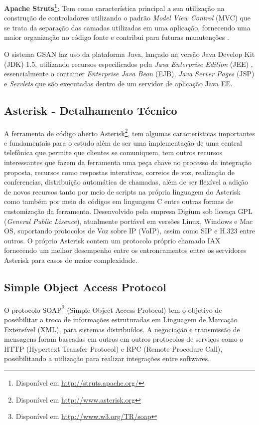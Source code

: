 \textbf{Apache Struts\footnote{Disponível em \url{http://struts.apache.org/}}}: Tem como característica principal a sua utilização na construção de controladores utilizando o padrão \textit{Model View Control} (MVC) que se trata da separação das camadas utilizadas em uma aplicação, fornecendo uma maior organização no código fonte e contribui para futuras manutenções \cite{fowler2003}. 

O sistema GSAN faz uso da plataforma Java, lançado na versão Java Develop Kit (JDK) 1.5, utilizando recursos especificados pela \textit{Java Enterprise Edition} (JEE) \cite{PORTAL:2014}, essencialmente o container \textit{Enterprise Java Bean} (EJB), \textit{Java Server Pages }(JSP) e \textit{Servlets} que são executadas dentro de um servidor de aplicação Java EE.


\subsection{Asterisk - Detalhamento Técnico}
A ferramenta de código aberto Asterisk\footnote{Disponível em \url{http://www.asterisk.org}}, tem algumas características importantes e fundamentais para o estudo além de ser uma implementação de uma central telefônica que permite que clientes se comuniquem, tem outros recursos interessantes que fazem da ferramenta uma peça chave no processo da integração proposta, recursos como respostas interativas, correios de voz, realização de conferencias, distribuição automática de chamadas, além de ser flexível a adição de novos recursos tanto por meio de scripts na própria linguagem do Asterisk como também por meio de códigos em linguagem C entre outras formas de customização da ferramenta. Desenvolvido pela empresa Digium sob licença GPL (\textit{General Public Lisence}), atualmente portável em versões Linux, Windows e Mac OS, suportando protocolos de Voz sobre IP (VoIP), assim como SIP e H.323 entre outros. O próprio Asterisk contem um protocolo próprio chamado IAX fornecendo um melhor desempenho entre os entroncamentos entre os servidores Asterisk para casos de maior complexidade.

\subsection{Simple Object Access Protocol}
O protocolo SOAP\footnote{Disponível em  \url{http://www.w3.org/TR/soap}} (Simple Object Access Protocol) tem o objetivo de possibilitar a troca de informações estruturadas em Linguagem de Marcação Extensível (XML), para sistemas distribuídos. A negociação e transmissão de mensagens foram baseadas em outros em outros protocolos de serviços como o HTTP (Hypertext Transfer Protocol) e RPC (Remote Procedure Call), possibilitando a utilização para realizar integrações entre softwares.

